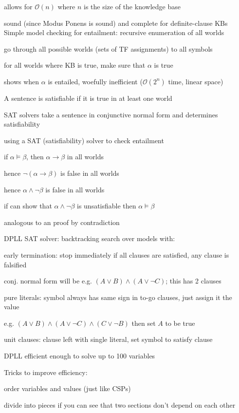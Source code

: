 \documentclass[12pt]{article}
\begin{document}
allows for $\mathcal{O}(n)$ where $n$ is the size of the knowledge base

sound (since Modus Ponens is sound) and complete for definite-clause KBs\\

\noindent
Simple model checking for entailment: recursive enumeration of all worlds

go through all possible worlds (sets of TF assignments) to all symbols

for all worlds where KB is true, make sure that $\alpha$ is true

shows when $\alpha$ is entailed, woefully inefficient ($\mathcal{O}(2^n)$ time, linear space)

\noindent
A sentence is satisfiable if it is true in at least one world

SAT solvers take a sentence in conjunctive normal form and determines satisfiability

using a SAT (satisfiability) solver to check entailment

if $\alpha \models \beta$, then $\alpha \to \beta$ in all worlds

hence $\neg(\alpha \to \beta)$ is false in all worlds

hence $\alpha \wedge \neg \beta$ is false in all worlds

if can show that $\alpha \wedge \neg \beta$ is unsatisfiable then $\alpha \models \beta$

analogous to an proof by contradiction

\noindent
DPLL SAT solver: backtracking search over models with:

early termination: stop immediately if all clauses are satisfied, any clause is falsified

conj. normal form will be e.g. $(A \vee B) \wedge (A \vee \neg C)$; this has 2 clauses

pure literals: symbol always has same sign in to-go clauses, just assign it the value

e.g. $(A \vee B) \wedge (A \vee \neg C) \wedge (C \vee \neg B)$ then set $A$ to be true

unit clauses: clause left with single literal, set symbol to satisfy clause

DPLL efficient enough to solve up to 100 variables

Tricks to improve efficiency:

order variables and values (just like CSPs)

divide into pieces if you can see that two sections don't depend on each other
\end{document}
